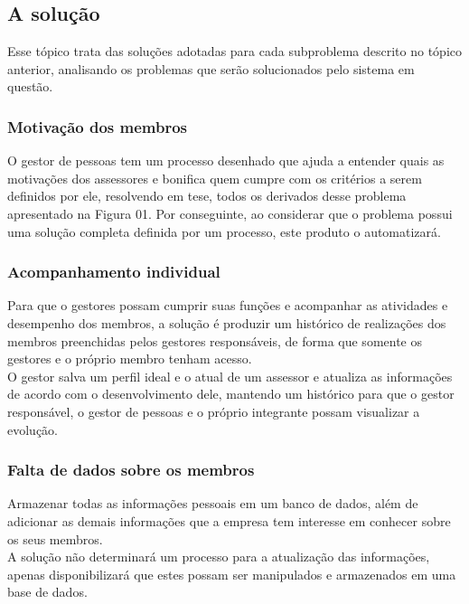 \begin{anexosenv}
\subsection[A solução]{A solução}

Esse tópico trata das soluções adotadas para cada subproblema descrito no tópico anterior, analisando os problemas que serão solucionados pelo sistema em questão.\\

\subsubsection[Motivação dos membros]{Motivação dos membros}

O gestor de pessoas tem um processo desenhado que  ajuda a entender quais as motivações dos assessores e bonifica quem cumpre com os critérios a serem definidos por ele, resolvendo em tese, todos os derivados desse problema apresentado na Figura 01. Por conseguinte, ao considerar que o problema possui uma solução completa definida por um processo, este produto o automatizará.\\

\subsubsection[Acompanhamento individual]{Acompanhamento individual}

Para que o gestores possam cumprir suas funções e acompanhar as atividades e desempenho dos membros, a solução é produzir um histórico de realizações dos membros preenchidas pelos gestores responsáveis, de forma que somente os gestores e o próprio membro tenham acesso.\\
O gestor salva um perfil ideal e o atual de um assessor e atualiza as informações de acordo com o desenvolvimento dele, mantendo um histórico para que o gestor responsável, o gestor de pessoas e o próprio integrante possam visualizar a evolução.\\

\subsubsection[Falta de dados sobre os membros]{Falta de dados sobre os membros}

Armazenar todas as informações pessoais em um banco de dados, além de adicionar as demais informações que a empresa tem interesse em conhecer sobre os seus membros.\\
A solução não determinará um processo para a atualização das informações, apenas disponibilizará que estes possam ser manipulados e armazenados em uma base de dados.\\


\end{anexosenv}
